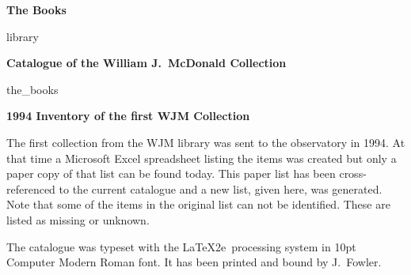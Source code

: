 \documentclass[letterpaper]{book}
\begin{document}
\vspace*{1 in}
\centerline{\Large \bf The Books}
\bigskip\bigskip
{library}
\newpage

\printbibliography

\mainmatter
\begin{center}
  {\Large \bf Catalogue of the William J.\ McDonald Collection}
\end{center}
\bigskip
{the_books}
\cleardoublepage

\begin{center}
  {\Large \bfseries 1994 Inventory of the first WJM Collection}
\end{center}
The first collection from the WJM library was sent to the observatory
in 1994. At that time a Microsoft Excel spreadsheet listing the items
was created but only a paper copy of that list can be found today.
This paper list has been cross-referenced to the current catalogue and
a new list, given here, was generated. Note that some of the items in
the original list can not be identified. These are listed as missing or
unknown.
\bigskip




\backmatter

\printindex[author]

\begin{colophon}
  The catalogue was typeset with the \LaTeX2e\ processing system in
  10pt Computer Modern Roman font. It has been printed and
  bound by J.~Fowler.
\end{colophon}
\end{document}
